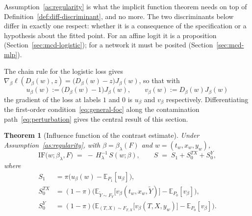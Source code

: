 \documentclass[11pt]{article}
\theoremstyle{plain}
\newtheorem{theorem}{Theorem}
\theoremstyle{definition}
\theoremstyle{remark}
\newcommand{\pE}{\ensuremath{\mathbb{E}}}
\newcommand{\ratio}{\ensuremath{\pi}}
\newcommand{\IF}{\mathrm{IF}}
\newcommand{\score}{S}
\begin{document}
Assumption~\ref{as:regularity} is what the implicit function theorem needs on top of
Definition~\ref{def:diff-discriminant}, and no more. The two discriminants below differ in
exactly one respect: whether it is a consequence of the specification or a hypothesis about the
fitted point. For an affine logit it is a proposition (Section~\ref{sec:mcd-logistic}); for a
network it must be posited (Section~\ref{sec:mcd-mlp}).

The chain rule for the logistic loss gives $\nabla_\beta\ell(D_\beta(w),z)
=\big(D_\beta(w)-z\big)J_\beta(w)$, so that with
\begin{equation}
u_\beta(w):=\big(D_\beta(w)-1\big)J_\beta(w),
\qquad
v_\beta(w):=D_\beta(w)J_\beta(w)
\label{eq:general-uv}
\end{equation}
the gradient of the loss at labels $1$ and $0$ is $u_\beta$ and $v_\beta$ respectively.
Differentiating the first-order condition~\eqref{eq:general-foc} along the contamination
path~\eqref{eq:perturbation} gives the central result of this section.

\begin{theorem}[Influence function of the contrast estimate]
\label{thm:channels}
Under Assumption~\ref{as:regularity}, with $\beta = \beta_\lambda(F)$ and $w=(t_w,x_w,y_w)$,
\begin{equation}
\IF\big(w;\beta_\lambda,F\big) \;=\; -\,H_\lambda^{-1}\,\score(w;\beta),
\qquad
\score \;=\; \score_1 + \score_0^{TX} + \score_0^{Y},
\label{eq:master}
\end{equation}
where
\begin{equation}
\begin{aligned}
\score_1 &= \ratio\Big( u_\beta(w) - \pE_{P_1}[u_\beta] \Big), \\
\score_0^{TX} &= (1-\ratio)\Big(
\pE_{\widetilde Y \sim F_Y}\big[ v_\beta(t_w,x_w,\widetilde Y) \big]
- \pE_{P_0}[v_\beta] \Big), \\
\score_0^{Y} &= (1-\ratio)\Big(
\pE_{(T,X) \sim F_{T,X}}\big[ v_\beta(T,X,y_w) \big]
- \pE_{P_0}[v_\beta] \Big).
\end{aligned}
\label{eq:channels}
\end{equation}
\end{theorem}
\end{document}
